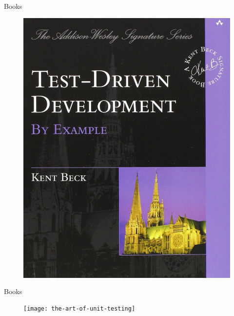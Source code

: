 \documentclass[14pt]{beamer}
\begin{document}
\begin{frame}[plain]{Books}
    \begin{figure}
        \center
        \includegraphics[height=.7\textheight]{TDD-by-Example}
        \label{fig:TDD-by-Example}
    \end{figure}
\end{frame}

\begin{frame}[plain]{Books}
    \begin{figure}
        \center
        \texttt{[image: the-art-of-unit-testing]}
        \label{fig:the-art-of-unit-testing}
    \end{figure}
\end{frame}
\end{document}
